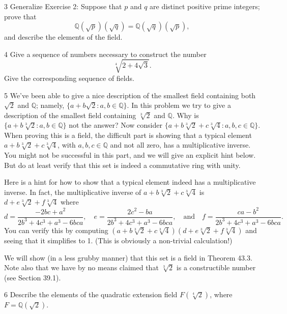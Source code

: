 \begin{problem}{3}
    Generalize Exercise 2: Suppose that $p$ and $q$ are distinct positive prime integers;
    prove that
    \[\mathbb{Q}(\sqrt{p})(\sqrt{q}) = \mathbb{Q}(\sqrt{q})(\sqrt{p}),\]
    and describe the elements of the field.
\end{problem}
\unsolved

\begin{problem}{4}
    Give a sequence of numbers necessary to construct the number
    \[\sqrt[4]{2 + 4\sqrt{3}}.\]
    Give the corresponding sequence of fields.
\end{problem}
\unsolved

\begin{problem}{5}
    We've been able to give a nice description of the smallest field containing both
    $\sqrt{2}$ and $\mathbb{Q}$; namely, $\{a + b\sqrt{2} : a, b \in \mathbb{Q}\}$. In this
    problem we try to give a description of the smallest field containing $\sqrt[3]{2}$ and
    $\mathbb{Q}$. Why is $\{a + b\sqrt[3]{2} : a, b \in \mathbb{Q}\}$ not the answer? Now
    consider $\{a + b\sqrt[3]{2} + c\sqrt[3]{4} : a, b, c \in \mathbb{Q}\}$. When proving
    this is a field, the difficult part is showing that a typical element
    $a + b\sqrt[3]{2} + c\sqrt[3]{4}$, with $a, b, c \in \mathbb{Q}$ and not all zero, has a
    multiplicative inverse. You might not be successful in this part, and we will give an
    explicit hint below. But do at least verify that this set is indeed a commutative ring
    with unity.

    Here is a hint for how to show that a typical element indeed has a multiplicative
    inverse. In fact, the multiplicative inverse of $a + b\sqrt[3]{2} + c\sqrt[3]{4}$ is
    $d + e\sqrt[3]{2} + f\sqrt[3]{4}$ where
    \[d = \frac{-2bc + a^2}{2b^3 + 4c^3 + a^3 - 6bca}, \quad
      e = \frac{2c^2 - ba}{2b^3 + 4c^3 + a^3 - 6bca}, \quad\text{and}\quad
      f = \frac{ca - b^2}{2b^3 + 4c^3 + a^3 - 6bca}.\]
    You can verify this by computing
    $(a + b\sqrt[3]{2} + c\sqrt[3]{4})(d + e\sqrt[3]{2} + f\sqrt[3]{4})$ and seeing that it
    simplifies to 1. (This is obviously a non-trivial calculation!)

    We will show (in a less grubby manner) that this set is a field in Theorem 43.3. Note
    also that we have by no means claimed that $\sqrt[3]{2}$ is a constructible number (see
    Section 39.1).
\end{problem}
\unsolved

\begin{problem}{6}
    Describe the elements of the quadratic extension field $F(\sqrt[4]{2})$, where
    $F = \mathbb{Q}(\sqrt{2})$.
\end{problem}
\unsolved

